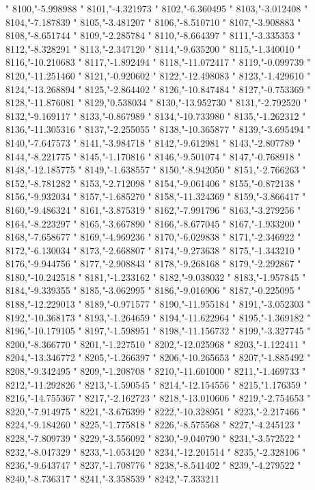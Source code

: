 "
8100,"-5.998988
"
8101,"-4.321973
"
8102,"-6.360495
"
8103,"-3.012408
"
8104,"-7.187839
"
8105,"-3.481207
"
8106,"-8.510710
"
8107,"-3.908883
"
8108,"-8.651744
"
8109,"-2.285784
"
8110,"-8.664397
"
8111,"-3.335353
"
8112,"-8.328291
"
8113,"-2.347120
"
8114,"-9.635200
"
8115,"-1.340010
"
8116,"-10.210683
"
8117,"-1.892494
"
8118,"-11.072417
"
8119,"-0.099739
"
8120,"-11.251460
"
8121,"-0.920602
"
8122,"-12.498083
"
8123,"-1.429610
"
8124,"-13.268894
"
8125,"-2.864402
"
8126,"-10.847484
"
8127,"-0.753369
"
8128,"-11.876081
"
8129,"0.538034
"
8130,"-13.952730
"
8131,"-2.792520
"
8132,"-9.169117
"
8133,"-0.867989
"
8134,"-10.733980
"
8135,"-1.262312
"
8136,"-11.305316
"
8137,"-2.255055
"
8138,"-10.365877
"
8139,"-3.695494
"
8140,"-7.647573
"
8141,"-3.984718
"
8142,"-9.612981
"
8143,"-2.807789
"
8144,"-8.221775
"
8145,"-1.170816
"
8146,"-9.501074
"
8147,"-0.768918
"
8148,"-12.185775
"
8149,"-1.638557
"
8150,"-8.942050
"
8151,"-2.766263
"
8152,"-8.781282
"
8153,"-2.712098
"
8154,"-9.061406
"
8155,"-0.872138
"
8156,"-9.932034
"
8157,"-1.685270
"
8158,"-11.324369
"
8159,"-3.866417
"
8160,"-9.486324
"
8161,"-3.875319
"
8162,"-7.991796
"
8163,"-3.279256
"
8164,"-8.223297
"
8165,"-3.667890
"
8166,"-8.677045
"
8167,"-1.933200
"
8168,"-7.658677
"
8169,"-4.969236
"
8170,"-6.029838
"
8171,"-2.346922
"
8172,"-6.130034
"
8173,"-2.668807
"
8174,"-9.273638
"
8175,"-1.343210
"
8176,"-9.944756
"
8177,"-2.908843
"
8178,"-9.268168
"
8179,"-2.292867
"
8180,"-10.242518
"
8181,"-1.233162
"
8182,"-9.038032
"
8183,"-1.957845
"
8184,"-9.339355
"
8185,"-3.062995
"
8186,"-9.016906
"
8187,"-0.225095
"
8188,"-12.229013
"
8189,"-0.971577
"
8190,"-11.955184
"
8191,"-3.052303
"
8192,"-10.368173
"
8193,"-1.264659
"
8194,"-11.622964
"
8195,"-1.369182
"
8196,"-10.179105
"
8197,"-1.598951
"
8198,"-11.156732
"
8199,"-3.327745
"
8200,"-8.366770
"
8201,"-1.227510
"
8202,"-12.025968
"
8203,"-1.122411
"
8204,"-13.346772
"
8205,"-1.266397
"
8206,"-10.265653
"
8207,"-1.885492
"
8208,"-9.342495
"
8209,"-1.208708
"
8210,"-11.601000
"
8211,"-1.469733
"
8212,"-11.292826
"
8213,"-1.590545
"
8214,"-12.154556
"
8215,"1.176359
"
8216,"-14.755367
"
8217,"-2.162723
"
8218,"-13.010606
"
8219,"-2.754653
"
8220,"-7.914975
"
8221,"-3.676399
"
8222,"-10.328951
"
8223,"-2.217466
"
8224,"-9.184260
"
8225,"-1.775818
"
8226,"-8.575568
"
8227,"-4.245123
"
8228,"-7.809739
"
8229,"-3.556092
"
8230,"-9.040790
"
8231,"-3.572522
"
8232,"-8.047329
"
8233,"-1.053420
"
8234,"-12.201514
"
8235,"-2.328106
"
8236,"-9.643747
"
8237,"-1.708776
"
8238,"-8.541402
"
8239,"-4.279522
"
8240,"-8.736317
"
8241,"-3.358539
"
8242,"-7.333211
